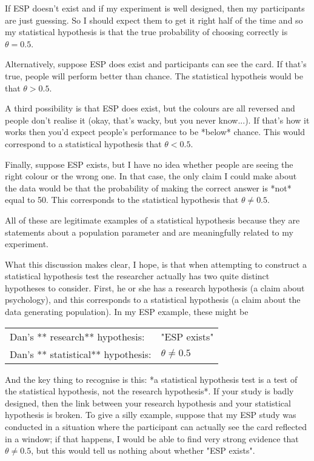 \item If ESP doesn't exist and if my experiment is well designed, then my participants are just guessing. So I should expect them to get it right half of the time and so my statistical hypothesis is that the true probability of choosing correctly is $\theta = 0.5$. 
\item Alternatively, suppose ESP does exist and participants can see the card. If that's true, people will perform better than chance. The statistical hypotheis would be that $\theta > 0.5$. 
\item A third possibility is that ESP does exist, but the colours are all reversed and people don't realise it (okay, that's wacky, but you never know...). If that's how it works then you'd expect people's performance to be *below* chance. This would correspond to a statistical hypothesis that $\theta < 0.5$. 
\item Finally, suppose ESP exists, but I have no idea whether people are seeing the right colour or the wrong one. In that case, the only claim I could make about the data would be that the probability of making the correct answer is *not* equal to 50. This corresponds to the statistical hypothesis that $\theta \neq 0.5$. 

All of these are legitimate examples of a statistical hypothesis because they are statements about a population parameter and are meaningfully related to my experiment.

What this discussion makes clear, I hope, is that when attempting to construct a statistical hypothesis test the researcher actually has two quite distinct hypotheses to consider. First, he or she has a research hypothesis (a claim about psychology), and this corresponds to a statistical hypothesis (a claim about the data generating population). In my ESP example, these might be
\begin{center}
\begin{tabular}{ll}
Dan's ** research** hypothesis: & "ESP exists" \\
Dan's ** statistical** hypothesis: & $\theta \neq 0.5$ \\
\end{tabular} 
\end{center}
And the key thing to recognise is this: *a statistical hypothesis test is a test of the statistical hypothesis, not the research hypothesis*. If your study is badly designed, then the link between your research hypothesis and your statistical hypothesis is broken. To give a silly example, suppose that my ESP study was conducted in a situation where the participant can actually see the card reflected in a window; if that happens, I would be able to find very strong evidence that $\theta \neq 0.5$, but this would tell us nothing about whether "ESP exists". 


